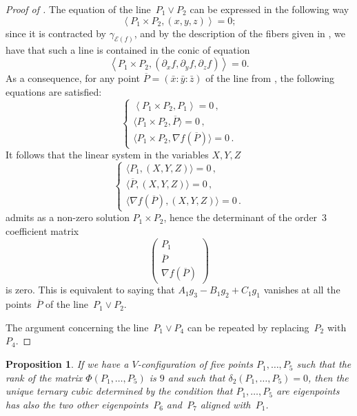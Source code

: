 \documentclass{amsart}
\theoremstyle{plain}
\newtheorem{prop}[lemma]{Proposition}
\theoremstyle{definition}
\newcommand{\de}{\partial}
\newcommand{\Eig}[1]{\mathcal{E}\!\left( {#1} \right)}
\begin{document}
\begin{proof}[Proof of ]
The equation of the line~$P_1 \vee P_2$ can be expressed in the following way
%
\begin{equation}
\label{eq:lineP1P2}
  \left\langle P_1 \times P_2, (x,y,z) \right\rangle = 0;
\end{equation}
%
since it is contracted by $\gamma_{\Eig{f}}$, and by the description of the fibers given in , we have that such a line is contained in the conic of equation
%
\[
  \left\langle P_1 \times P_2, (\de_x f, \de_y f, \de_z f) \right\rangle = 0.
\]
%
As a consequence, for any point $\overline{P} = (\bar x: \bar y: \bar z)$ of the line from , the following equations are satisfied:
%
\[
  \left\{
  \begin{array}{l}
    \left\langle P_1 \times P_2, P_1 \right\rangle = 0 \,,\\[2pt]
    \bigl\langle P_1 \times P_2, \overline{P} \bigr\rangle = 0 \,,\\[2pt]
    \bigl\langle P_1 \times P_2, \nabla f (\overline{P}) \bigr\rangle = 0 \,.
  \end{array}
  \right.
\]
%
It follows that the linear system in the variables $X,Y,Z$
%
\[
  \left\{
  \begin{array}{l}
    \bigl\langle P_1, (X,Y,Z) \bigr\rangle = 0 \,,\\[2pt]
    \bigl\langle \overline{P}, (X,Y,Z) \bigr\rangle = 0 \,,\\[2pt]
    \bigl\langle \nabla f (\overline{P}),
    (X,Y,Z) \bigr\rangle = 0 \,.
  \end{array}
  \right.
\]
%
admits as a non-zero solution $P_1 \times P_2$,
hence the determinant of the order~$3$ coefficient matrix
%
\[
  \left(
  \begin{array}{c}
    P_1 \\
    \overline{P} \\
    \nabla f (\overline{P})
  \end{array}
  \right)
\]
%
is zero. This is equivalent to saying that $A_1 g_3 - B_1 g_2 + C_1 g_1$ vanishes at all the points~$\overline{P}$ of the line~$P_1 \vee P_2$.

The argument concerning the line~$P_1 \vee P_4$ can be repeated by replacing~$P_2$ with~$P_4$.
\end{proof}
%
\begin{prop}
\label{proposition:third_alignment}
If we have a $V$-configuration of five points $P_1, \dots, P_5$
such that the rank of the matrix $\Phi(P_1, \dots, P_5)$ is $9$ and
such that $\delta_2(P_1, \dots, P_5) = 0$,
then the unique ternary cubic determined by the condition that $P_1, \dots, P_5$
are eigenpoints has also the two other eigenpoints~$P_6$ and~$P_7$
aligned with~$P_1$.
\end{prop}
\end{document}
